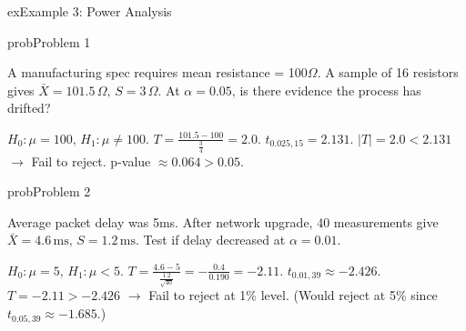 \begin{PSbox}[unbreakable]{ex}{Example 3: Power Analysis}
\begin{Shaded}
\begin{Highlighting}[]
\OperatorTok{;}
\NormalTok{(}\OperatorTok{,} \OperatorTok{,} \OperatorTok{,} \OperatorTok{,} \NormalTok{)}\OperatorTok{;}
\NormalTok{(}\NormalTok{)}\OperatorTok{;} \NormalTok{(}\NormalTok{)}\OperatorTok{;}
\NormalTok{(}\NormalTok{(}\OperatorTok{,} \OperatorTok{*}\NormalTok{))}\OperatorTok{;}
 \OperatorTok{;}
\NormalTok{(}\OperatorTok{,} \OperatorTok{,} \NormalTok{)}\OperatorTok{;}
\NormalTok{(}\OperatorTok{,} \NormalTok{(}\NormalTok{(} \OperatorTok{\textgreater{}=} \OperatorTok{,} \NormalTok{)))}\OperatorTok{;}
\end{Highlighting}
\end{Shaded}

\end{PSbox}


\begin{PSbox}[unbreakable]{prob}{Problem 1}

A manufacturing spec requires mean resistance = 100\ensuremath{\Omega}. A sample of 16 resistors gives $\bar{X} = 101.5\,\Omega,\, S = 3\,\Omega$. At $\alpha = 0.05$, is there evidence the process has drifted?

\PSsolution{} $H_{0}: \mu = 100,\, H_{1}: \mu \ne 100$. $T = \frac{101.5-100}{\frac{3}{4}} = 2.0$. $t_{0.025,15} = 2.131$. $\lvert T\rvert = 2.0 < 2.131$ \ensuremath{\to} Fail to reject. p-value $\approx 0.064 > 0.05$.

\end{PSbox}

\begin{PSbox}[unbreakable]{prob}{Problem 2}

Average packet delay was 5ms. After network upgrade, 40 measurements give $\bar{X} = 4.6\,\mathrm{ms},\, S = 1.2\,\mathrm{ms}$. Test if delay decreased at $\alpha = 0.01$.

\PSsolution{} $H_{0}: \mu = 5,\, H_{1}: \mu < 5$. $T = \frac{4.6-5}{\frac{1.2}{\sqrt{40}}} = -\frac{0.4}{0.190} = -2.11$. $t_{0.01,39} \approx -2.426$. $T = -2.11 > -2.426$ \ensuremath{\to} Fail to reject at 1\% level. (Would reject at 5\% since $t_{0.05,39} \approx -1.685.$)

\end{PSbox}

